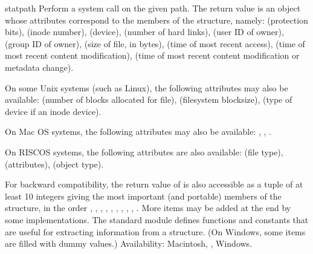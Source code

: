 \begin{funcdesc}{stat}{path}
Perform a  system call on the given path.  The
return value is an object whose attributes correspond to the members of
the  structure, namely:
 (protection bits),
 (inode number),
 (device),
 (number of hard links),
 (user ID of owner),
 (group ID of owner),
 (size of file, in bytes),
 (time of most recent access),
 (time of most recent content modification),
(time of most recent content modification or metadata change).


On some Unix systems (such as Linux), the following attributes may
also be available:
 (number of blocks allocated for file),
 (filesystem blocksize),
 (type of device if an inode device).

On Mac OS systems, the following attributes may also be available:
,
,
.

On RISCOS systems, the following attributes are also available:
 (file type),
 (attributes),
 (object type).

For backward compatibility, the return value of  is
also accessible as a tuple of at least 10 integers giving the most
important (and portable) members of the  structure, in the
order
,
,
,
,
,
,
,
,
,
.
More items may be added at the end by some implementations.
The standard module  defines
functions and constants that are useful for extracting information
from a  structure.
(On Windows, some items are filled with dummy values.)
Availability: Macintosh, \UNIX, Windows.

\end{funcdesc}

